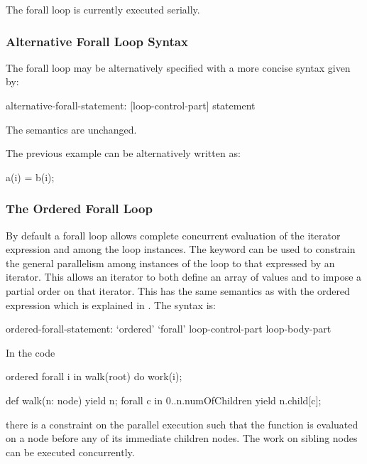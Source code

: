 \begin{status}
The forall loop is currently executed serially.
\end{status}

\subsubsection{Alternative Forall Loop Syntax}
\label{Alternative_Forall_Loop_Syntax}

The forall loop may be alternatively specified with a more concise
syntax given by:
\begin{syntax}
alternative-forall-statement:
  [loop-control-part] statement
\end{syntax}
The semantics are unchanged.

\begin{example}
The previous  example can be alternatively written as:
\begin{chapel}
[i in 1..N] a(i) = b(i);
\end{chapel}
\end{example}

\subsubsection{The Ordered Forall Loop}
\label{Ordered_Forall}

By default a forall loop allows complete concurrent evaluation of the
iterator expression and among the loop instances. The
keyword  can be used to constrain the general
parallelism among instances of the loop to that expressed by an
iterator. This allows an iterator to both define an array of values
and to impose a partial order on that iterator.  This has the same
semantics as with the ordered expression which is explained
in .  The syntax is:
\begin{syntax}
ordered-forall-statement:
   `ordered' `forall' loop-control-part loop-body-part
\end{syntax}

\begin{example}
In the code
\begin{chapel}
ordered forall i in walk(root) do
  work(i);

def walk(n: node) {
  yield n;
  forall c in 0..n.numOfChildren {
      yield n.child[c];
  }
}
\end{chapel}
there is a constraint on the parallel execution such that the
function  is evaluated on a node before any of its
immediate children nodes.  The work on sibling nodes can be executed
concurrently.
\end{example}

